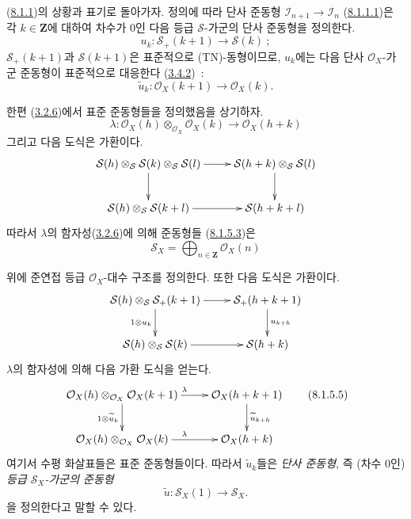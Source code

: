 \begin{env}[8.1.5]
\label{II.8.1.5-ko}
(\hyperref[II.8.1.1-ko]{8.1.1})의 상황과 표기로 돌아가자. 정의에 따라
단사 준동형 $\mathcal{I}_{n+1}\to\mathcal{I}_n$
(\hyperref[II.8.1.1.1-ko]{8.1.1.1})은 각 $k\in\mathbf{Z}$에 대하여
차수가 $0$인 다음 등급 $\mathcal{S}$-가군의 단사 준동형을 정의한다.
\begin{equation}
\label{II.8.1.5.1-ko}
  u_k:\mathcal{S}_+(k+1)\to\mathcal{S}(k)~;
\tag{8.1.5.1}
\end{equation}
$\mathcal{S}_+(k+1)$과 $\mathcal{S}(k+1)$은 표준적으로
(TN)-동형이므로, $u_k$에는 다음 단사 $\mathcal{O}_X$-가군 준동형이
표준적으로 대응한다 (\hyperref[II.3.4.2-ko]{3.4.2})~:
\begin{equation}
\label{II.8.1.5.2-ko}
  \widetilde{u}_k:\mathcal{O}_X(k+1)\to\mathcal{O}_X(k).
\tag{8.1.5.2}
\end{equation}

한편 (\hyperref[II.3.2.6-ko]{3.2.6})에서 표준 준동형들을
정의했음을 상기하자.
\begin{equation}
\label{II.8.1.5.3-ko}
  \lambda:\mathcal{O}_X(h)\otimes_{\mathcal{O}_X}\mathcal{O}_X(k)
  \to\mathcal{O}_X(h+k)
\tag{8.1.5.3}
\end{equation}
그리고 다음 도식은 가환이다.
\[
\xymatrix{
  \mathcal{S}(h)\otimes_{\mathcal{S}}\mathcal{S}(k)
    \otimes_{\mathcal{S}}\mathcal{S}(l)\ar[r]\ar[d]
  & \mathcal{S}(h+k)\otimes_{\mathcal{S}}\mathcal{S}(l)\ar[d]\\
  \mathcal{S}(h)\otimes_{\mathcal{S}}\mathcal{S}(k+l)\ar[r]
  & \mathcal{S}(h+k+l)
}
\]
따라서 $\lambda$의 함자성(\hyperref[II.3.2.6-ko]{3.2.6})에 의해
준동형들 (\hyperref[II.8.1.5.3-ko]{8.1.5.3})은
\begin{equation}
\label{II.8.1.5.4-ko}
  \mathcal{S}_X=\bigoplus_{n\in\mathbf{Z}}\mathcal{O}_X(n)
\tag{8.1.5.4}
\end{equation}

위에 준연접 등급 $\mathcal{O}_X$-대수 구조를 정의한다. 또한 다음 도식은
가환이다.
\[
\xymatrix{
  \mathcal{S}(h)\otimes_{\mathcal{S}}\mathcal{S}_+(k+1)\ar[r]\ar[d]_{1\otimes u_k}
  & \mathcal{S}_+(h+k+1)\ar[d]^{u_{k+h}}\\
  \mathcal{S}(h)\otimes_{\mathcal{S}}\mathcal{S}(k)\ar[r]
  & \mathcal{S}(h+k)
}
\]
$\lambda$의 함자성에 의해 다음 가환 도식을 얻는다.
\begin{equation}
\label{II.8.1.5.5-ko}
\xymatrix{
  \mathcal{O}_X(h)\otimes_{\mathcal{O}_X}\mathcal{O}_X(k+1)
    \ar[r]^{\lambda}\ar[d]_{1\otimes\widetilde{u}_k}
  & \mathcal{O}_X(h+k+1)\ar[d]^{\widetilde{u}_{k+h}}\\
  \mathcal{O}_X(h)\otimes_{\mathcal{O}_X}\mathcal{O}_X(k)
    \ar[r]^{\lambda}
  & \mathcal{O}_X(h+k)
}
\tag{8.1.5.5}
\end{equation}
여기서 수평 화살표들은 표준 준동형들이다. 따라서 $\widetilde{u}_k$들은
\emph{단사 준동형}, 즉 (차수 $0$인) \emph{등급 $\mathcal{S}_X$-가군의 준동형}
\begin{equation}
\label{II.8.1.5.6-ko}
  \widetilde{u}:\mathcal{S}_X(1)\to\mathcal{S}_X.
\tag{8.1.5.6}
\end{equation}
을 정의한다고 말할 수 있다.
\end{env}

